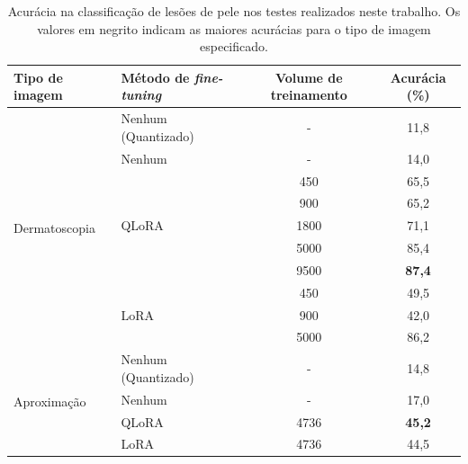 \begin{table}[ht]
    \caption{\small Acurácia na classificação de lesões de pele nos testes realizados neste trabalho. Os valores em
    negrito indicam as maiores acurácias para o tipo de imagem especificado.}
    \centering
    \begin{tabular}{l|l|c|c}
        \hline
        Tipo de imagem                  & Método de \textit{fine-tuning} & Volume de treinamento &
        Acurácia (\%)
        \\
        \hline
        \multirow{10}{*}{Dermatoscopia} & Nenhum (Quantizado)            & -                     & 11,8
        \\
                                        & Nenhum                         & -                     & 14,0
        \\
        \cline{2--2}
                                        & \multirow{5}{*}{\ac{QLoRA}}    & 450                   & 65,5
        \\
                                        &                                & 900                   & 65,2
        \\
                                        &                                & 1800                  & 71,1
        \\
                                        &                                & 5000                  & 85,4
        \\
                                        &                                & 9500                  &
        \textbf{87,4}
        \\
        \cline{2--2}
                                        & \multirow{3}{*}{\ac{LoRA}}     & 450                   & 49,5
        \\
                                        &                                & 900                   & 42,0
        \\
                                        &                                & 5000                  & 86,2
        \\
        \hline
        \multirow{4}{*}{Aproximação}    & Nenhum (Quantizado)            & -                     & 14,8
        \\
                                        & Nenhum                         & -                     & 17,0
        \\
        \cline{2--2}
                                        & \ac{QLoRA}                     & 4736                  &
        \textbf{45,2}
        \\
        \cline{2--2}
                                        & \ac{LoRA}                      & 4736                  & 44,5
        \\
        \hline
    \end{tabular}
    \label{tab:overall_comparison_skin_lesions}
\end{table}

